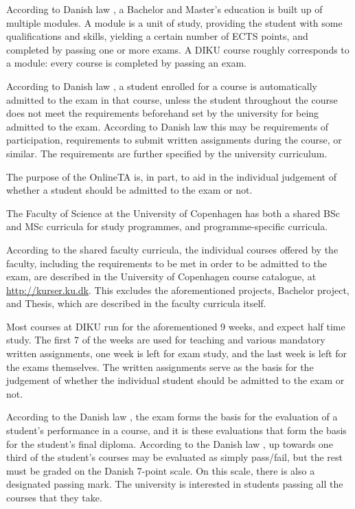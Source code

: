 According to Danish law \cite[, parts 1 \& 2]{bek814}, a
Bachelor and Master's education is built up of multiple modules. A module is
a unit of study, providing the student with some qualifications and skills,
yielding a certain number of ECTS points, and completed by passing one or more
exams. A DIKU course roughly corresponds to a module: every course is completed
by passing an exam.

According to Danish law \cite[, parts 1 \& 4]{bek666}, a
student enrolled for a course is automatically admitted to the exam in that
course, unless the student throughout the course does not meet the requirements
beforehand set by the university for being admitted to the exam. According to
Danish law \cite[, parts 2 \& 3]{bek666} this may be
requirements of participation, requirements to submit written assignments
during the course, or similar. The requirements are further specified by the
university curriculum.

The purpose of the OnlineTA is, in part, to aid in the individual judgement of
whether a student should be admitted to the exam or not.

The Faculty of Science at the University of Copenhagen has both a shared BSc
and MSc curricula for study programmes\cite{faelles-del-ENG}, and
programme-specific curricula.

According to the shared faculty curricula, the individual courses offered by
the faculty, including the requirements to be met in order to be admitted to
the exam, are described in the University of Copenhagen course catalogue, at
\url{http://kurser.ku.dk}. This excludes the aforementioned projects, Bachelor
project, and Thesis, which are described in the faculty curricula itself.

Most courses at DIKU run for the aforementioned 9 weeks, and expect half time
study. The first 7 of the weeks are used for teaching and various mandatory
written assignments, one week is left for exam study, and the last week is left
for the exams themselves. The written assignments serve as the basis for the
judgement of whether the individual student should be admitted to the exam or
not.

According to the Danish law \cite[\textsection\ 2]{bek666}, the exam forms the
basis for the evaluation of a student's performance in a course, and it is
these evaluations that form the basis for the student's final diploma.
According to the Danish law \cite[\textsection\ 23]{bek666}, up towards one
third of the student's courses may be evaluated as simply pass/fail, but the
rest must be graded on the Danish 7-point scale\cite{bek250}. On this scale,
there is also a designated passing mark. The university is interested in
students passing all the courses that they take.

